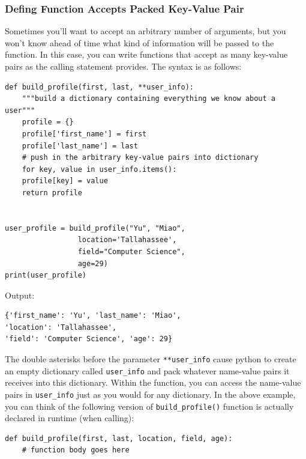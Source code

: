 \documentclass[12pt]{book}
\begin{document}
\subsubsection{Defing Function Accepts Packed Key-Value Pair}
\label{sec:org304ff42}
Sometimes you’ll want to accept an arbitrary number of arguments, but you won’t know ahead of time what kind of information will be passed to the function. In this case, you can write functions that accept as many key-value pairs as the calling statement provides. The syntax is as follows:
\begin{verbatim}
def build_profile(first, last, **user_info):
    """build a dictionary containing everything we know about a user"""
    profile = {}
    profile['first_name'] = first
    profile['last_name'] = last
    # push in the arbitrary key-value pairs into dictionary
    for key, value in user_info.items():
	profile[key] = value
    return profile


user_profile = build_profile("Yu", "Miao",
			     location='Tallahassee',
			     field="Computer Science",
			     age=29)
print(user_profile)

\end{verbatim}
Output:
\begin{verbatim}
{'first_name': 'Yu', 'last_name': 'Miao',
'location': 'Tallahassee',
'field': 'Computer Science', 'age': 29}
\end{verbatim}
The double asterisks before the parameter \texttt{**user\_info} cause python to create an empty dictionary called \texttt{user\_info} and pack whatever name-value pairs it receives into this dictionary. Within the function, you can access the name-value pairs in \texttt{user\_info} just as you would for any dictionary. In the above example, you can think of the following version of \texttt{build\_profile()} function is actually declared in runtime (when calling):
\begin{verbatim}
def build_profile(first, last, location, field, age):
    # function body goes here
\end{verbatim}
\end{document}
